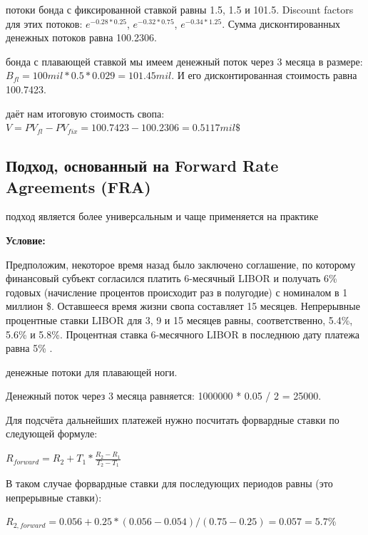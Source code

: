 \documentclass{article}
\begin{document}
 потоки бонда с фиксированной ставкой равны 1.5, 1.5 и 101.5. Discount factors для этих потоков: $e^{-0.28*0.25}$, $e^{-0.32*0.75}$, $e^{-0.34*1.25}$. Сумма дисконтированных денежных потоков равна 100.2306.

 бонда с плавающей ставкой мы имеем денежный поток через 3 месяца в размере: $B_{fl} = 100 mil * 0.5*0.029 = 101.45 mil$. И его дисконтированная стоимость равна 100.7423.

 даёт нам итоговую стоимость свопа: $V = PV_{fl} - PV_{fix} = 100.7423 - 100.2306 = 0.5117 mil \$ $

\subsection{Подход, основанный на Forward Rate Agreements (FRA)}

\begin{itemize}
 подход является более универсальным и чаще применяется на практике
\end{itemize}

\textbf{Условие:}

Предположим, некоторое время назад было заключено соглашение, по которому финансовый субъект согласился платить 6-месячный LIBOR и получать 6\% годовых (начисление процентов происходит раз в полугодие) с номиналом в 1 миллион \$. Оставшееся время жизни свопа составляет 15 месяцев. Непрерывные процентные ставки LIBOR для 3, 9 и 15 месяцев равны, соответственно, 5.4\%, 5.6\% и 5.8\%. Процентная ставка 6-месячного LIBOR в последнюю дату платежа равна 5\% .

\text{}

 денежные потоки для плавающей ноги.

Денежный поток через 3 месяца равняется: 1000000 * 0.05 / 2 = 25000.

Для подсчёта дальнейших платежей нужно посчитать форвардные ставки по следующей формуле:

\text{}

\begin{center}

$R_{forward} = R_2 + T_1 *\frac{R_2 - R_1}{T_2 - T_1}$

\end{center}

\text{}

В таком случае форвардные ставки для последующих периодов равны (это непрерывные ставки):

$R_{2, forward} = 0.056 + 0.25*(0.056 - 0.054)/(0.75 - 0.25) = 0.057 = 5.7\%$
\end{document}
